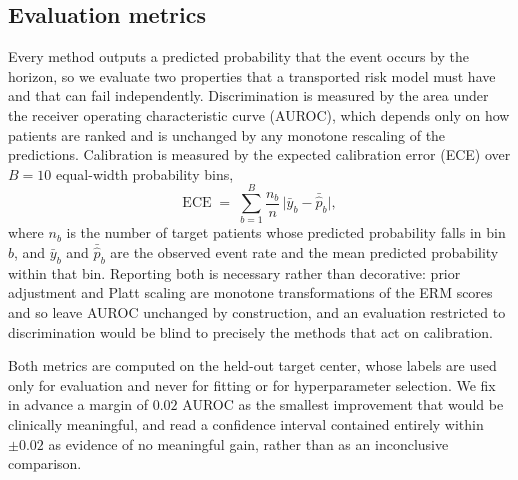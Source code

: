 \subsection{Evaluation metrics}
Every method outputs a predicted probability that the event occurs by the
horizon, so we evaluate two properties that a transported risk model must have
and that can fail independently. Discrimination is measured by the area under
the receiver operating characteristic curve (AUROC), which depends only on how
patients are ranked and is unchanged by any monotone rescaling of the
predictions. Calibration is measured by the expected calibration error (ECE)
over $B=10$ equal-width probability bins,
\begin{equation}
\mathrm{ECE} \;=\; \sum_{b=1}^{B} \frac{n_b}{n}\,
  \bigl\lvert \bar{y}_b - \bar{\hat{p}}_b \bigr\rvert ,
\end{equation}
where $n_b$ is the number of target patients whose predicted probability falls
in bin $b$, and $\bar{y}_b$ and $\bar{\hat{p}}_b$ are the observed event rate and
the mean predicted probability within that bin. Reporting both is necessary
rather than decorative: prior adjustment and Platt scaling are monotone
transformations of the ERM scores and so leave AUROC unchanged by construction,
and an evaluation restricted to discrimination would be blind to precisely the
methods that act on calibration.

Both metrics are computed on the held-out target center, whose labels are used
only for evaluation and never for fitting or for hyperparameter selection. We
fix in advance a margin of $0.02$ AUROC as the smallest improvement that would
be clinically meaningful, and read a confidence interval contained entirely
within $\pm 0.02$ as evidence of no meaningful gain, rather than as an
inconclusive comparison.
